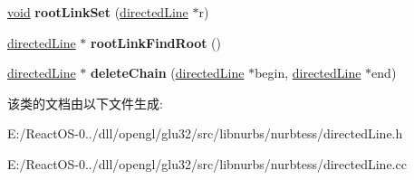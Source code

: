 \begin{DoxyCompactItemize}
\item 
\mbox{\label{classdirected_line_a397db2e72cedf1e00bfcbbc05b6e8d20}} 
\hyperlink{interfacevoid}{void} {\bfseries root\+Link\+Set} (\hyperlink{classdirected_line}{directed\+Line} $\ast$r)
\item 
\mbox{\label{classdirected_line_a915f9c5000865076e9764f5d2d283110}} 
\hyperlink{classdirected_line}{directed\+Line} $\ast$ {\bfseries root\+Link\+Find\+Root} ()
\item 
\mbox{\label{classdirected_line_a3a4b5f1d0de8fe8a0f5427c0de9160cf}} 
\hyperlink{classdirected_line}{directed\+Line} $\ast$ {\bfseries delete\+Chain} (\hyperlink{classdirected_line}{directed\+Line} $\ast$begin, \hyperlink{classdirected_line}{directed\+Line} $\ast$end)
\end{DoxyCompactItemize}


该类的文档由以下文件生成\+:\begin{DoxyCompactItemize}
\item 
E\+:/\+React\+O\+S-\/0../dll/opengl/glu32/src/libnurbs/nurbtess/directed\+Line.\+h\item 
E\+:/\+React\+O\+S-\/0../dll/opengl/glu32/src/libnurbs/nurbtess/directed\+Line.\+cc\end{DoxyCompactItemize}
